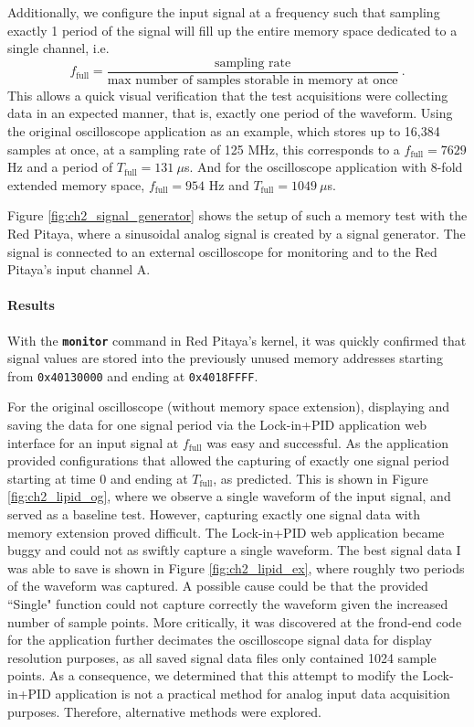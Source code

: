Additionally, we configure the input signal at a frequency such that sampling exactly 1 period of the signal will fill up the entire memory space dedicated to a single channel, i.e.
\begin{equation}\label{eq:f_full}
    f_\text{full} = \frac{\text{sampling rate}}{\text{max number of samples storable in memory at once}}\ .
\end{equation}
This allows a quick visual verification that the test acquisitions were collecting data in an expected manner, that is, exactly one period of the waveform. Using the original oscilloscope application as an example, which stores up to 16,384 samples at once, at a sampling rate of 125 MHz, this corresponds to a $f_\text{full} = 7629$ Hz and a period of $T_\text{full} = 131\ \mu$s. And for the oscilloscope application with 8-fold extended memory space, $f_\text{full} = 954$ Hz and $T_\text{full} = 1049\ \mu$s.

Figure \ref{fig:ch2_signal_generator} shows the setup of such a memory test with the Red Pitaya, where a sinusoidal analog signal is created by a signal generator. The signal is connected to an external oscilloscope for monitoring and to the Red Pitaya's input channel A.


\paragraph{Results}

With the \textbf{\texttt{monitor}} command in Red Pitaya's kernel, it was quickly confirmed that signal values are stored into the previously unused memory addresses starting from \texttt{0x40130000} and ending at \texttt{0x4018FFFF}.

For the original oscilloscope (without memory space extension), displaying and saving the data for one signal period via the Lock-in+PID application web interface for an input signal at $f_\text{full}$ was easy and successful. As the application provided configurations that allowed the capturing of exactly one signal period starting at time 0 and ending at $T_\text{full}$, as predicted. This is shown in Figure \ref{fig:ch2_lipid_og}, where we observe a single waveform of the input signal, and served as a baseline test. However, capturing exactly one signal data with memory extension proved difficult. The Lock-in+PID web application became buggy and could not as swiftly capture a single waveform. The best signal data I was able to save is shown in Figure \ref{fig:ch2_lipid_ex}, where roughly two periods of the waveform was captured. A possible cause could be that the provided ``Single" function could not capture correctly the waveform given the increased number of sample points. More critically, it was discovered at the frond-end code for the application further decimates the oscilloscope signal data for display resolution purposes, as all saved signal data files only contained 1024 sample points. As a consequence, we determined that this attempt to modify the Lock-in+PID application is not a practical method for analog input data acquisition purposes. Therefore, alternative methods were explored.

